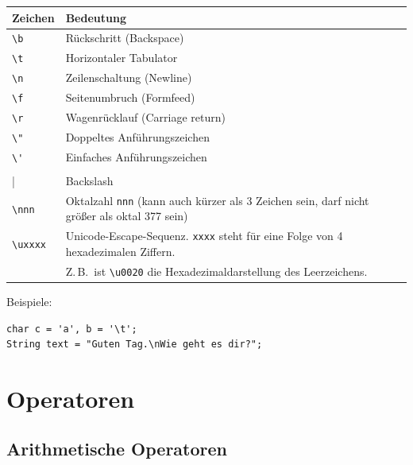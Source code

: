 \begin{description}
\begin{tabular}{|l|l|}\hline
\textbf{Zeichen} & \textbf{Bedeutung} \\ \hline
{\lstinline|\b|} & Rückschritt (Backspace) \\ \hline
{\lstinline|\t|} & Horizontaler Tabulator \\ \hline
{\lstinline|\n|} & Zeilenschaltung (Newline) \\ \hline
{\lstinline|\f|} & Seitenumbruch (Formfeed) \\ \hline
{\lstinline|\r|} & Wagenrücklauf (Carriage return) \\ \hline
{\lstinline|\"|} & Doppeltes Anführungszeichen \\ \hline
{\lstinline|\'|} & Einfaches Anführungszeichen \\ \hline
{\lstinline|\\|} & Backslash \\ \hline
{\lstinline|\nnn|} & Oktalzahl \texttt{nnn} (kann auch kürzer als 3 Zeichen sein, darf
nicht größer als oktal 377 sein) \\ \hline
{\lstinline|\uxxxx|} & Unicode-Escape-Sequenz. \texttt{xxxx} steht für eine Folge von 4
hexadezimalen Ziffern.\\
& Z.\,B.\ ist {\lstinline|\u0020|} die Hexadezimaldarstellung des Leerzeichens.
\\ \hline
\end{tabular}

Beispiele:

\begin{lstlisting}
char c = 'a', b = '\t';
String text = "Guten Tag.\nWie geht es dir?";
\end{lstlisting}
\end{description}


\section{Operatoren}

\subsection{Arithmetische Operatoren}


